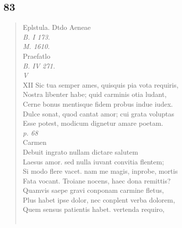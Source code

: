 \documentclass[11pt, a4paper]{report}
\begin{document}
            \subsection*{83}
      \begin{verse}
       \lbrack Eplstula. Dtdo Aeneae \rbrack  \\ \textit{B. I 173.} \\ \textit{M. 1610.} \\ Praefatlo \\ \textit{B. IV 271.} \\ \textit{V} \\ XII Sic tua semper ames, quisquis pia vota requiris, \\ Nostra libenter habe; quid carminis otia ludant, \\ Cerne bonus mentisque fidem probus indue iudex. \\ Dulce sonat, quod cantat amor; cui grata voluptas \\ Esse potest, modicum dignetur amare poetam. \\ \textit{p. 68} \\ Carmen \\ Debuit ingrato nullam dictare salutem \\ Laesus amor. sed nulla iuvant convitia flentem; \\ Si modo flere vacet. nam me magis, inprobe, mortis \\ Fata vocant. Troiane nocens, haec dona remittis? \\ Quamvis saepe gravi conponam carmine fletus, \\ Plus habet ipse dolor, nec conplent verba dolorem, \\ Quem sensus patientis habet. vertenda requiro, \\ 
        ﻿\pagebreak 

\end{verse}
\end{document}
